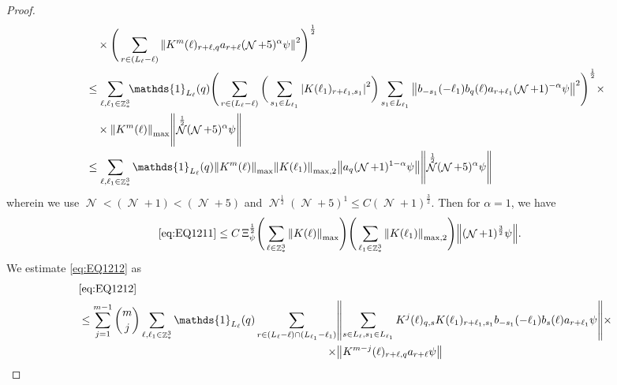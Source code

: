 \documentclass[sn-mathphys, Numbered ,a4paper]{sn-jnl}%
\DeclareMathOperator{\Z}{\mathbb{Z}}
\DeclareMathOperator{\NN}{\mathcal{N}}
\newcommand{\half}{\frac{1}{2}}
\theoremstyle{plain}
\theoremstyle{definition}
\theoremstyle{remark}
\theoremstyle{plain}
\theoremstyle{definition}
\theoremstyle{remark}
\begin{document}
\begin{proof}
\begin{align}
	&\quad \times \Bigg( \sum\limits_{r \in (L_\ell-\ell)}  \norm{  K^{m}(\ell)_{r+\ell,q}  a_{r+\ell} (\NN+5)^{\alpha}\psi }^2\Bigg)^\half \nonumber\\
	&\leq \sum\limits_{\ell,\ell_1 \in \Z^3_*} \!\!\mathds{1}_{L_\ell}(q) \Bigg( \sum\limits_{r \in (L_\ell-\ell)} \bigg( \sum\limits_{s_1 \in L_{\ell_1}}\abs{K(\ell_1)_{r+\ell_1,s_1}}^2\bigg) \sum\limits_{s_1 \in L_{\ell_1}} \norm{ b_{-s_1}(-\ell_1) b_{q}(\ell) a_{r+\ell_1} (\NN+1)^{-\alpha}\psi}^2\Bigg)^\half \times\nonumber\\
	&\quad \times  \norm{  K^{m}(\ell)}_{\mathrm{max}} \norm{ \NN^\half(\NN+5)^{\alpha}\psi } \nonumber\\
	&\leq \sum\limits_{\ell ,\ell_1\in \Z^3_*}\mathds{1}_{L_\ell}(q) \norm{  K^{m}(\ell)}_{\mathrm{max}}   \norm{K(\ell_1)}_{\mathrm{max,2}}  \norm{   a_{q}(\NN+1)^{1-\alpha}\psi} \norm{ \NN^\half (\NN+5)^{\alpha}\psi } \nonumber\\
\end{align}
wherein we use $\NN<(\NN+1)<(\NN+5)$ and $\NN^\half(\NN+5)^1\leq C(\NN+1)^{\frac{3}{2}}$. Then for $\alpha = 1$, we have
\begin{align}
	\eqref{eq:EQ1211}&\leq C\, \Xi_{\psi}^\half \Bigg( \sum\limits_{\ell \in \Z^3_*} \norm{K(\ell)}_{\mathrm{max}} \Bigg) \Bigg( \sum\limits_{\ell_1 \in \Z^3_*}\norm{K(\ell_1)}_{\mathrm{max,2}} \Bigg)  \norm { (\NN+1)^{\frac{3}{2}} \psi }. \label{eq:estEQ1211}    
\end{align}
We estimate \eqref{eq:EQ1212} as 
\begin{alignat}{2}
	&\eqref{eq:EQ1212}\nonumber\\
	&\leq \sum\limits_{j=1}^{m-1} {{m}\choose j} \sum\limits_{\ell, \ell_1\in \Z^3_*} \mathds{1}_{L_{\ell}}(q)\, \begin{aligned}[t]
	\sum\limits_{r\in (L_{\ell}-\ell) \cap (L_{\ell_1}-\ell_1)} &\norm{ \sum\limits_{s \in L_\ell, s_1 \in L_{\ell_1}} K^{j}(\ell)_{q,s} K(\ell_1)_{r+\ell_1,s_1} b_{-s_1}(-\ell_1) b_{s}(\ell) a_{r+\ell_1}\psi}\times\nonumber\\\times&\norm{  K^{m-j}(\ell)_{r+\ell,q} a_{r+\ell} \psi }

\end{aligned}
\end{alignat}
\end{proof}
\end{document}
